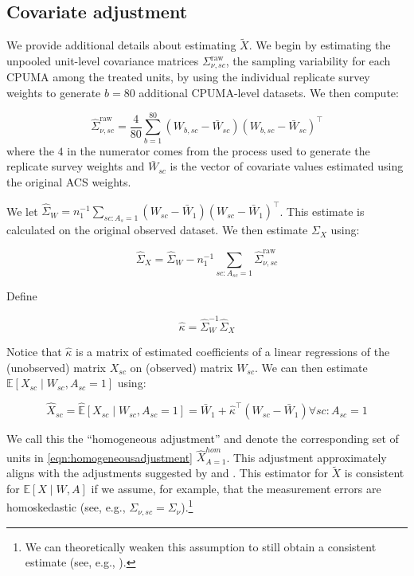 \subsection{Covariate adjustment}

We provide additional details about estimating $\tilde{X}$. We begin by estimating the unpooled unit-level covariance matrices $\Sigma_{\nu, sc}^{\text{raw}}$, the sampling variability for each CPUMA among the treated units, by using the individual replicate survey weights to generate $b = 80$ additional CPUMA-level datasets. We then compute:

\begin{equation}
\hat{\Sigma}_{\nu, sc}^{\text{raw}} = \frac{4}{80}\sum_{b=1}^{80}(W_{b, sc} - \bar{W}_{sc})(W_{b, sc} - \bar{W}_{sc})^\top
\end{equation}
%
where the $4$ in the numerator comes from the process used to generate the replicate survey weights and $\bar{W}_{sc}$ is the vector of covariate values estimated using the original ACS weights.

We let $\hat{\Sigma}_{W} = n_1^{-1}\sum_{sc: A_s = 1} (W_{sc} - \bar{W}_1)(W_{sc} - \bar{W}_1)^\top$. This estimate is calculated on the original observed dataset. We then estimate $\Sigma_{X}$ using:

\begin{equation}
\hat{\Sigma}_X = \hat{\Sigma}_W - n_1^{-1}\sum_{sc: A_{sc} = 1} \hat{\Sigma}_{\nu, sc}^{\text{raw}}
\end{equation}

Define

\begin{equation}
\hat{\kappa} = \hat{\Sigma}_W^{-1}\hat{\Sigma}_X
\end{equation}

Notice that $\hat{\kappa}$ is a matrix of estimated coefficients of a linear regressions of the (unobserved) matrix $X_{sc}$ on (observed) matrix $W_{sc}$. We can then estimate $\mathbb{E}[X_{sc} \mid W_{sc}, A_{sc} = 1]$ using: 

\begin{equation}\label{eqn:homogeneousadjustment}
\hat{X}_{sc} = \hat{\mathbb{E}}[X_{sc} \mid W_{sc}, A_{sc} = 1] = \bar{W}_1 + \hat{\kappa}^\top(W_{sc} - \bar{W}_1) \forall sc: A_{sc} = 1
\end{equation}

We call this the ``homogeneous adjustment'' and denote the corresponding set of units in \eqref{eqn:homogeneousadjustment} $\hat{X}_{A=1}^{hom}$. This adjustment approximately aligns with the adjustments suggested by \citet{carroll2006measurement} and \citet{gleser1992importance}. This estimator for $\tilde{X}$ is consistent for $\mathbb{E}[X \mid W, A]$ if we assume, for example, that the measurement errors are homoskedastic (see, e.g., $\Sigma_{\nu, sc} = \Sigma_{\nu}$).\footnote{We can theoretically weaken this assumption to still obtain a consistent estimate (see, e.g., \citet{buonaccorsi2010measurement}).}

